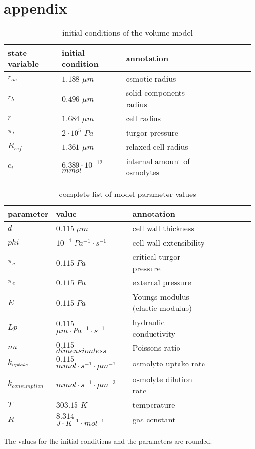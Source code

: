 \section{appendix}
\begin{table} [h]
	\footnotesize
	\begin{center} 
		\caption{initial conditions of the volume model}
		\begin{tabular} {l l l l l l l l}
		\hline
	 	\textbf{state variable} & \textbf{initial condition} & \textbf{annotation}  \\
	 	\hline
	 	$r_{os}$ & $1.188$ $\mu m$ & osmotic radius\\
	 	$r_{b}$ & $0.496$ $\mu m$ &solid components radius\\
	 	$r$ & $1.684$ $\mu m$ & cell radius\\
	 	$\pi_t$ & $2 \cdot 10^5$ $Pa$ & turgor pressure\\
	 	$R_{ref}$ & $1.361$ $\mu m$ & relaxed cell radius \\
	 	$c_{i}$ & $6.389 \cdot 10^{-12}$ $mmol$ & internal amount of osmolytes\\
	 	\hline
		\end{tabular}
		\label{initCondVolume}
	\end{center}
\end{table}

\begin{table} [h]
	\footnotesize
	\begin{center} 
		\caption{complete list of model parameter values}
		\begin{tabular} {l l l l l l l l}
			\hline
			\textbf{parameter} & \textbf{value} & \textbf{annotation}  \\
			\hline
			$d$ & $0.115$ $\mu m$ & cell wall thickness\\
			$phi$ & $10^{-4}$ $Pa^{-1} \cdot s^{-1}$ & cell wall extensibility\\
			$\pi_c$ & $0.115$ $Pa$ & critical turgor pressure\\
			$\pi_e$ & $0.115$ $Pa$ & external pressure\\
			$E$ & $0.115$ $Pa$ & Youngs modulus (elastic modulus)\\
			$Lp$ & $0.115$ $\mu m \cdot Pa^{-1} \cdot s^{-1}$ & hydraulic conductivity\\
			$nu$ & $0.115$ $dimensionless$ & Poissons ratio\\
			$k_{uptake}$ & $0.115$ $mmol \cdot s^{-1} \cdot \mu m ^{-2} $ & osmolyte uptake rate\\
			$k_{consumption}$ & $mmol \cdot s^{-1} \cdot \mu m ^{-3} $ & osmolyte dilution rate\\
			$T$ & $303.15$ $K$ & temperature\\
			$R$ & $8.314$ $J \cdot K^{-1} \cdot mol^{-1}$ & gas constant \\
			\hline
		\end{tabular}
		\label{parameterVolume}
	\end{center}
\end{table}
The values for the initial conditions and the parameters are rounded.

